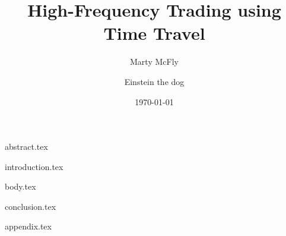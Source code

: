 \documentclass[]{vegaarticle}
\title{High-Frequency Trading using Time Travel}
\author[1]{Marty McFly}
\affil[1]{University of Time Travel}
\author[2]{Einstein the dog}
\affil[2]{University of Great Scott}
\date{\today}
\begin{document}
    \maketitle	                  %

    {abstract.tex}     %
    
    {introduction.tex} %
    
    {body.tex}         %

    {conclusion.tex}   %

    
    {appendix.tex}     %
\end{document}
